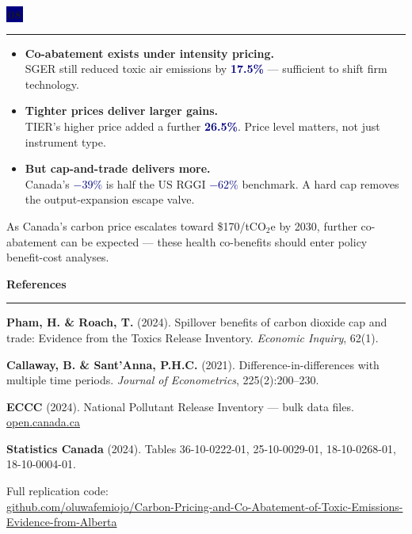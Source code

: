 \documentclass[aspectratio=169,12pt]{beamer}
\newcommand{\badge}[2][Navy]{%
  \colorbox{#1}{\color{white}\,\textbf{\small #2}\,}%
}
\newcommand{\slidetitle}[1]{%
  \vspace{0.6em}%
  {\color{Navy}\LARGE\textbf{#1}}%
  \vspace{0.3em}\par%
  \textcolor{Blue}{\rule{\linewidth}{1.2pt}}\par%
  \vspace{0.4em}%
}
\newcommand{\hi}[1]{\textcolor{Navy}{\textbf{#1}}}
\begin{document}
\begin{frame}
\badge{08}
\vspace{0.3em}\par
{\color{Blue}\rule{\linewidth}{0.8pt}}\par
\vspace{0.35em}

\begin{itemize}\setlength\itemsep{0.5em}

\item \textbf{Co-abatement exists under intensity pricing.}\\
  {\small SGER still reduced toxic air emissions by \hi{17.5\%} — sufficient
  to shift firm technology.}

\item \textbf{Tighter prices deliver larger gains.}\\
  {\small TIER's higher price added a further \hi{26.5\%}.
  Price level matters, not just instrument type.}

\item \textbf{But cap-and-trade delivers more.}\\
  {\small Canada's \hi{$-39\%$} is half the US RGGI \hi{$-62\%$} benchmark.
  A hard cap removes the output-expansion escape valve.}

\end{itemize}

\vspace{0.3em}
\begin{tcolorbox}[resultbox]
\small As Canada's carbon price escalates toward \$170/tCO$_2$e by 2030,
further co-abatement can be expected — these health co-benefits should
enter policy benefit-cost analyses.
\end{tcolorbox}
\end{frame}

\begin{frame}
\slidetitle{References}

{\small
\textbf{Pham, H. \& Roach, T.} (2024). Spillover benefits of carbon dioxide
cap and trade: Evidence from the Toxics Release Inventory.
\textit{Economic Inquiry}, 62(1).

\vspace{0.5em}
\textbf{Callaway, B. \& Sant'Anna, P.H.C.} (2021). Difference-in-differences
with multiple time periods.
\textit{Journal of Econometrics}, 225(2):200--230.

\vspace{0.5em}
\textbf{ECCC} (2024). National Pollutant Release Inventory — bulk data files.
\url{open.canada.ca}

\vspace{0.5em}
\textbf{Statistics Canada} (2024). Tables 36-10-0222-01, 25-10-0029-01,
18-10-0268-01, 18-10-0004-01.
}

\vspace{0.8em}
{\scriptsize\textcolor{MidGray}{%
Full replication code:\\
\url{github.com/oluwafemiojo/Carbon-Pricing-and-Co-Abatement-of-Toxic-Emissions-Evidence-from-Alberta}}}
\end{frame}
\end{document}
